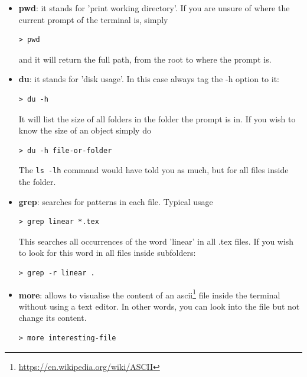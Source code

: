 \begin{itemize}
\item {\color{teal} \bf pwd}: it stands for 'print working directory'. If you are unsure of where
the current prompt of the terminal is, simply 
\begin{mdframed}[backgroundcolor=gray!10]
\begin{verbatim}
> pwd 
\end{verbatim}
\end{mdframed}
and it will return the full path, from the root to where the prompt is. 


\item {\color{teal} \bf du}: it stands for 'disk usage'. In this case always tag the -h option to it:
\begin{mdframed}[backgroundcolor=gray!10]
\begin{verbatim}
> du -h 
\end{verbatim}
\end{mdframed}
It will list the size of all folders in the folder the prompt is in. If you wish to know the size of an object
simply do 
\begin{mdframed}[backgroundcolor=gray!10]
\begin{verbatim}
> du -h file-or-folder 
\end{verbatim}
\end{mdframed}
The {\tt ls -lh} command would have told you as much, but for all files inside the folder.

\item {\color{teal} \bf grep}: searches for patterns in each file. Typical usage 
\begin{mdframed}[backgroundcolor=gray!10]
\begin{verbatim}
> grep linear *.tex 
\end{verbatim}
\end{mdframed}
This searches all occurrences of the word 'linear' in all .tex files. If you 
wish to look for this word in all files inside subfolders:
\begin{mdframed}[backgroundcolor=gray!10]
\begin{verbatim}
> grep -r linear .
\end{verbatim}
\end{mdframed}

\item {\color{teal} \bf more}: allows to visualise the content of an ascii\footnote{\url{https://en.wikipedia.org/wiki/ASCII}} file
inside the terminal without using a text editor. In other words, you can look into the file but not change its content.
\begin{mdframed}[backgroundcolor=gray!10]
\begin{verbatim}
> more interesting-file
\end{verbatim}
\end{mdframed}
 


\end{itemize}
